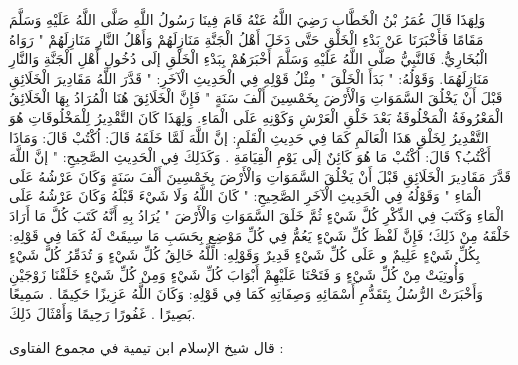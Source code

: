 وَلِهَذَا قَالَ {عُمَرُ بْنُ الْخَطَّابِ رَضِيَ اللَّهُ عَنْهُ قَامَ فِينَا رَسُولُ اللَّهِ صَلَّى اللَّهُ عَلَيْهِ وَسَلَّمَ مَقَامًا فَأَخْبَرَنَا عَنْ بَدْءِ الْخَلْقِ حَتَّى دَخَلَ أَهْلُ الْجَنَّةِ مَنَازِلَهُمْ وَأَهْلُ النَّارِ مَنَازِلَهُمْ} " رَوَاهُ الْبُخَارِيُّ. فَالنَّبِيُّ صَلَّى اللَّهُ عَلَيْهِ وَسَلَّمَ أَخْبَرَهُمْ بِبَدْءِ الْخَلْقِ إلَى دُخُولِ أَهْلِ الْجَنَّةِ وَالنَّارِ مَنَازِلَهُمَا. وَقَوْلُهُ: " بَدَأَ الْخَلْقَ " مِثْلُ قَوْلِهِ فِي الْحَدِيثِ الْآخَرِ: " {قَدَّرَ اللَّهُ مَقَادِيرَ الْخَلَائِقِ قَبْلَ أَنْ يَخْلُقَ السَّمَوَاتِ وَالْأَرْضَ بِخَمْسِينَ أَلْفَ سَنَةٍ} " فَإِنَّ الْخَلَائِقَ هُنَا الْمُرَادُ بِهَا الْخَلَائِقُ الْمَعْرُوفَةُ الْمَخْلُوقَةُ بَعْدَ خَلْقِ الْعَرْشِ وَكَوْنِهِ عَلَى الْمَاءِ. وَلِهَذَا كَانَ التَّقْدِيرُ لِلْمَخْلُوقَاتِ هُوَ التَّقْدِيرُ لِخَلْقِ هَذَا الْعَالَمِ كَمَا فِي حَدِيثِ الْقَلَمِ: {إنَّ اللَّهَ لَمَّا خَلَقَهُ قَالَ: اُكْتُبْ قَالَ: وَمَاذَا أَكْتُبُ؟ قَالَ: اُكْتُبْ مَا هُوَ كَائِنٌ إلَى يَوْمِ الْقِيَامَةِ} . وَكَذَلِكَ فِي الْحَدِيثِ الصَّحِيحِ: " {إنَّ اللَّهَ قَدَّرَ مَقَادِيرَ الْخَلَائِقِ قَبْلَ أَنْ يَخْلُقَ السَّمَوَاتِ وَالْأَرْضَ بِخَمْسِينَ أَلْفَ سَنَةٍ وَكَانَ عَرْشُهُ عَلَى الْمَاءِ} " وَقَوْلُهُ فِي الْحَدِيثِ الْآخَرِ الصَّحِيحِ: " {كَانَ اللَّهُ وَلَا شَيْءَ قَبْلَهُ وَكَانَ عَرْشُهُ عَلَى الْمَاءِ وَكَتَبَ فِي الذِّكْرِ كُلَّ شَيْءٍ ثُمَّ خَلَقَ السَّمَوَاتِ وَالْأَرْضَ} " يُرَادُ بِهِ أَنَّهُ كَتَبَ كُلَّ مَا أَرَادَ خَلْقَهُ مِنْ ذَلِكَ؛ فَإِنَّ لَفْظَ كُلِّ شَيْءٍ يَعُمُّ فِي كُلِّ مَوْضِعٍ بِحَسَبِ مَا سِيقَتْ لَهُ كَمَا فِي قَوْلِهِ: {بِكُلِّ شَيْءٍ عَلِيمٌ} و {عَلَى كُلِّ شَيْءٍ قَدِيرٌ} وَقَوْلِهِ: {اللَّهُ خَالِقُ كُلِّ شَيْءٍ} وَ {تُدَمِّرُ كُلَّ شَيْءٍ} {وَأُوتِيَتْ مِنْ كُلِّ شَيْءٍ} وَ {فَتَحْنَا عَلَيْهِمْ أَبْوَابَ كُلِّ شَيْءٍ} {وَمِنْ كُلِّ شَيْءٍ خَلَقْنَا زَوْجَيْنِ} وَأَخْبَرَتْ الرُّسُلُ بِتَقَدُّمِ أَسْمَائِهِ وَصِفَاتِهِ كَمَا فِي قَوْلِهِ: {وَكَانَ اللَّهُ عَزِيزًا حَكِيمًا} . {سَمِيعًا بَصِيرًا} . {غَفُورًا رَحِيمًا} وَأَمْثَالَ ذَلِكَ.

قال شيخ الإسلام ابن تيمية في مجموع الفتاوى \href{https://shamela.ws/book/7289/2988#p1}{\faExternalLink}:

